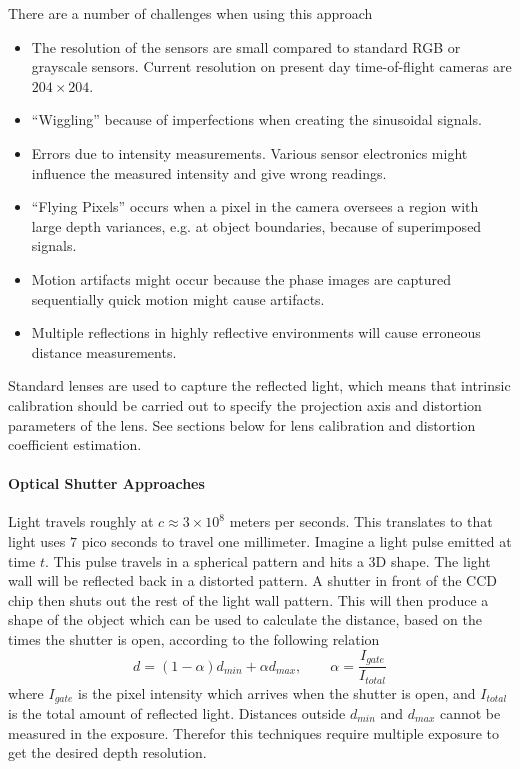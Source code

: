 There are a number of challenges when using this approach
\cite{time-of-flight-comp-graphics}
\begin{itemize}
    \item The resolution of the sensors are small compared to standard RGB or grayscale
        sensors. Current resolution on present day time-of-flight cameras are $204 \times
        204$. 
    \item ``Wiggling'' because of imperfections when creating the sinusoidal signals.
    \item Errors due to intensity measurements. Various sensor electronics might influence
        the measured intensity and give wrong readings.
    \item ``Flying Pixels'' occurs when a pixel in the camera oversees a region with
        large depth variances, e.g. at object boundaries, because of superimposed signals. 
    \item Motion artifacts might occur because the phase images are captured sequentially
        quick motion might cause artifacts.
    \item Multiple reflections in highly reflective environments will cause erroneous
        distance measurements.
\end{itemize}

Standard lenses are used to capture the reflected light, which means that intrinsic
calibration should be carried out to specify the projection axis and distortion parameters
of the lens. See sections below for lens calibration and distortion coefficient
estimation. \cite{time-of-flight-comp-graphics}


\paragraph{Optical Shutter Approaches}
Light travels roughly at $c \approx 3 \times 10^8$ meters per seconds. This translates to
that light uses $7$ pico seconds to travel one millimeter. Imagine a light pulse emitted
at time $t$. This pulse travels in a spherical pattern and hits a 3D shape. The light wall
will be reflected back in a distorted pattern.\cite{optical-shutter} 
A shutter in front of the CCD chip then
shuts out the rest of the light wall pattern. This will then produce a shape of the object
which can be used to calculate the distance, based on the times the shutter is open,
according to the following relation \cite{time-of-flight-comp-graphics}
\begin{equation}
    d = (1 - \alpha) d_{min} + \alpha d_{max}, \quad \quad \alpha =
    \frac{I_{gate}}{I_{total}}
\end{equation}
where $I_{gate}$ is the pixel intensity which arrives when the shutter is open, and
$I_{total}$ is the total amount of reflected light. Distances outside $d_{min}$ and
$d_{max}$ cannot be measured in the exposure. Therefor this techniques require multiple
exposure to get the desired depth resolution. 

